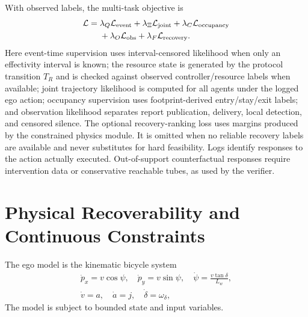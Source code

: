 \documentclass[letterpaper]{article} %
\begin{document}
With observed labels, the multi-task objective is
\begin{equation}
\begin{aligned}
\mathcal L={}&\lambda_Q\mathcal L_{\rm event}
+\lambda_\Xi\mathcal L_{\rm joint}
+\lambda_C\mathcal L_{\rm occupancy}\\
&+\lambda_O\mathcal L_{\rm obs}
+\lambda_F\mathcal L_{\rm recovery}.
\end{aligned}
\label{eq:training}
\end{equation}
Here event-time supervision uses interval-censored likelihood when only an
effectivity interval is known; the resource state is generated by the protocol
transition $T_R$ and is checked against observed controller/resource labels
when available; joint trajectory likelihood is computed for all agents under
the logged ego action; occupancy supervision uses
footprint-derived entry/stay/exit labels; and observation likelihood
separates report publication, delivery, local detection, and censored silence.
The optional recovery-ranking loss uses margins produced by the constrained
physics module. It is omitted when no reliable recovery labels are available
and never substitutes for hard feasibility. Logs identify responses to the
action actually executed. Out-of-support counterfactual responses require
intervention data or conservative reachable tubes, as used by the verifier.

\section{Physical Recoverability and Continuous Constraints}
\label{app:physical}
The ego model is the kinematic bicycle system
\begin{gather}
\dot p_x=v\cos\psi,\quad \dot p_y=v\sin\psi,\quad
\dot\psi=\frac{v\tan\delta}{L_w},\nonumber\\
\dot v=a,\quad\dot a=j,\quad\dot\delta=\omega_\delta,
\label{eq:bicycle}
\end{gather}
The model is subject to bounded state and input variables.
\end{document}
